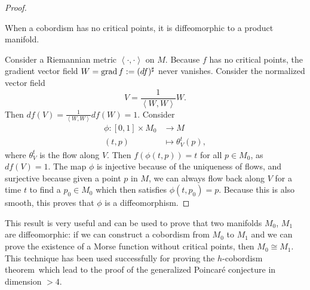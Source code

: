 \begin{proof}
    \begin{marginfigure}
        \centering
        \caption{
            When a cobordism has no critical points, it is diffeomorphic to a product manifold. }
        \label{fig:proof-of-cobordism-without-critical-points}
    \end{marginfigure}
    Consider a Riemannian metric $\left<\cdot ,\cdot  \right>$ on $M$.
    Because  $f$ has no critical points, the gradient vector field $W = \operatorname{grad} f := (df)^{\sharp}$ never vanishes.
    Consider the normalized vector field
    \[
    V = \frac{1}{\left<W, W \right>} W
    .\] 
    Then $df(V) = \frac{1}{\left<W, W \right>} df(W) = 1$.
    Consider
    \begin{align*}
        \phi: [0, 1] \times M_0&\longrightarrow M \\
        (t, p) &\longmapsto \theta_V^{t}(p)
    ,\end{align*}
    where $\theta_V^{t}$ is the flow along $V$.
    Then $f(\phi(t, p)) = t$ for all $p \in M_0$, as $df(V) = 1$.
    The map $\phi$ is injective because of the uniqueness of flows, and surjective because given a point $p$ in $M$, we can always flow back along $V$ for a time $t$ to find a $p_0 \in M_0$ which then satisfies $\phi(t, p_0) = p$. 
    Because this is also smooth, this proves that $\phi$ is a diffeomorphism.
\end{proof}

\begin{remark}
    This result is very useful and can be used to prove that two manifolds $M_0$, $M_1$ are diffeomorphic: if we can construct a cobordism from $M_0$ to $M_1$ and we can prove the existence of a Morse function without critical points, then $M_0 \cong M_1$.
    This technique has been used successfully for proving the $h$-cobordism theorem\sidenotemark\ which lead to the proof of the generalized Poincaré conjecture in dimension $> 4$.
\end{remark}

